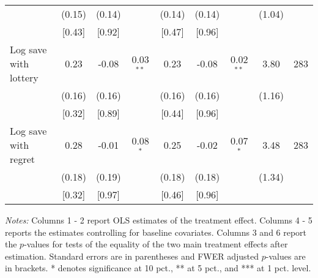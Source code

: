 \begin{table}[htbp]
{\begin{threeparttable}
\begin{tabular}{l*{8}{c}}
          &   (0.15)&   (0.14)&         &   (0.14)&   (0.14)&         &   (1.04)&         \\
          &   [0.43]&   [0.92]&         &   [0.47]&   [0.96]&         &         &         \\
Log save with lottery&     0.23&    -0.08&0.03$^{**}$&     0.23&    -0.08&0.02$^{**}$&     3.80&      283\\
          &   (0.16)&   (0.16)&         &   (0.16)&   (0.16)&         &   (1.16)&         \\
          &   [0.32]&   [0.89]&         &   [0.44]&   [0.96]&         &         &         \\
Log save with regret&     0.28&    -0.01&0.08$^{*}$&     0.25&    -0.02&0.07$^{*}$&     3.48&      283\\
          &   (0.18)&   (0.19)&         &   (0.18)&   (0.18)&         &   (1.34)&         \\
          &   [0.32]&   [0.97]&         &   [0.46]&   [0.96]&         &         &         \\
\bottomrule \end{tabular} \begin{tablenotes}[flushleft] \footnotesize \item \emph{Notes:} Columns 1 - 2 report OLS estimates of the treatment effect. Columns 4 - 5 reports the estimates controlling for baseline covariates. Columns 3 and 6 report the \(p\)-values for tests of the equality of the two main treatment effects after estimation. Standard errors are in parentheses and FWER adjusted \(p\)-values are in brackets. * denotes significance at 10 pct., ** at 5 pct., and *** at 1 pct. level. \end{tablenotes} \end{threeparttable} } \end{table}
